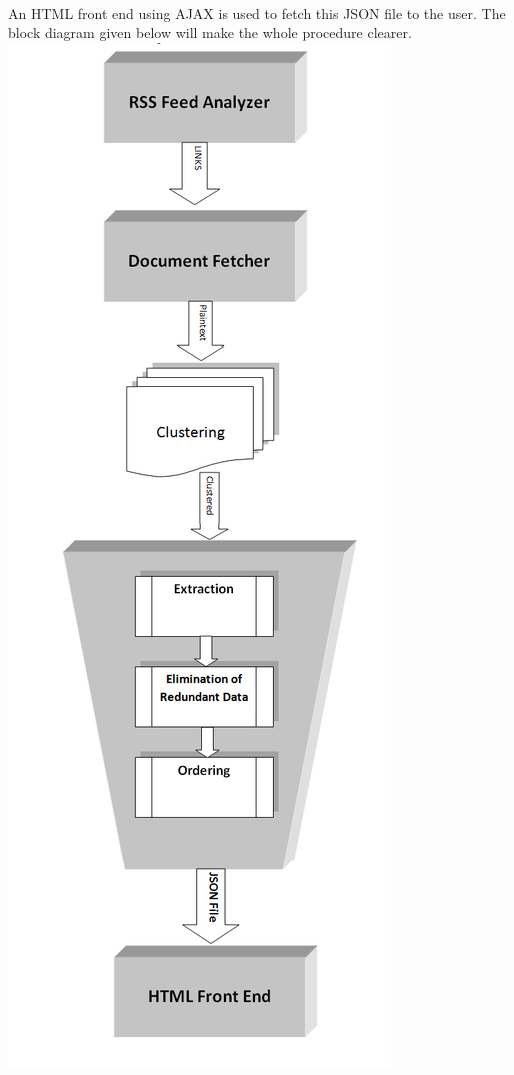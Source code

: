 \paragraph{} An HTML front end using AJAX is used to fetch this JSON file to the user. The block diagram given below will make the whole procedure clearer.
\newpage
\includegraphics[scale=0.4]{my/images/gh}
